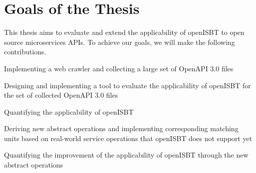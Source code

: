 \section{Goals of the Thesis}
\label{sec:goals}

This thesis aims to evaluate and extend the applicability of openISBT to open source microservices APIs. To achieve our goals, we will make the following contributions.

\begin{cEnum}
    \item Implementing a web crawler and collecting a large set of OpenAPI 3.0 files
    \item Designing and implementing a tool to evaluate the applicability of openISBT for the set of collected OpenAPI 3.0 files
    \item Quantifying the applicability of openISBT
    \item Deriving new abstract operations and implementing corresponding matching units based on real-world service operations that openISBT does not support yet
    \item Quantifying the improvement of the applicability of openISBT through the new abstract operations
\end{cEnum}